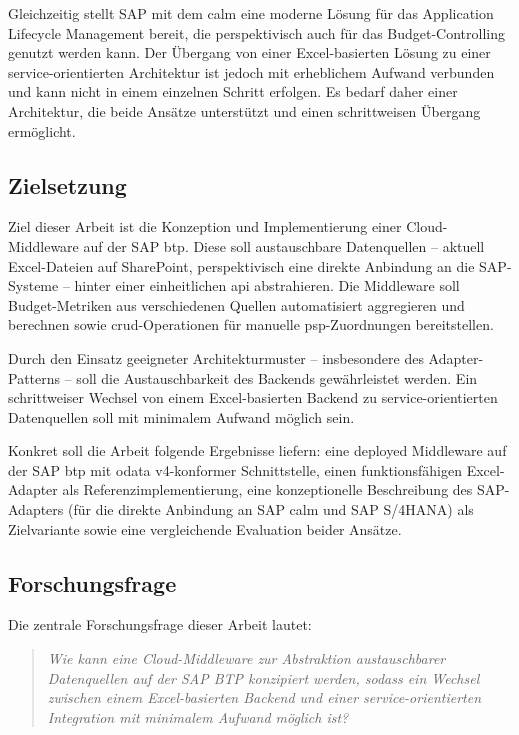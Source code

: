 Gleichzeitig stellt SAP mit dem \gls{calm} eine moderne Lösung für das Application Lifecycle Management bereit, die perspektivisch auch für das Budget-Controlling genutzt werden kann. Der Übergang von einer Excel-basierten Lösung zu einer service-orientierten Architektur ist jedoch mit erheblichem Aufwand verbunden und kann nicht in einem einzelnen Schritt erfolgen. Es bedarf daher einer Architektur, die beide Ansätze unterstützt und einen schrittweisen Übergang ermöglicht.

\subsection{Zielsetzung}

Ziel dieser Arbeit ist die Konzeption und Implementierung einer Cloud-Middleware auf der SAP \gls{btp}. Diese soll austauschbare Datenquellen -- aktuell Excel-Dateien auf SharePoint, perspektivisch eine direkte Anbindung an die SAP-Systeme -- hinter einer einheitlichen \gls{api} abstrahieren. Die Middleware soll Budget-Metriken aus verschiedenen Quellen automatisiert aggregieren und berechnen sowie \gls{crud}-Operationen für manuelle \gls{psp}-Zuordnungen bereitstellen.

Durch den Einsatz geeigneter Architekturmuster -- insbesondere des Adapter-Patterns -- soll die Austauschbarkeit des Backends gewährleistet werden. Ein schrittweiser Wechsel von einem Excel-basierten Backend zu service-orientierten Datenquellen soll mit minimalem Aufwand möglich sein.

Konkret soll die Arbeit folgende Ergebnisse liefern: eine deployed Middleware auf der SAP \gls{btp} mit \gls{odata} v4-konformer Schnittstelle, einen funktionsfähigen Excel-Adapter als Referenzimplementierung, eine konzeptionelle Beschreibung des SAP-Adapters (für die direkte Anbindung an SAP \gls{calm} und SAP S/4HANA) als Zielvariante sowie eine vergleichende Evaluation beider Ansätze.

\subsection{Forschungsfrage}

Die zentrale Forschungsfrage dieser Arbeit lautet:

\begin{quote}
\textit{Wie kann eine Cloud-Middleware zur Abstraktion austauschbarer Datenquellen auf der SAP BTP konzipiert werden, sodass ein Wechsel zwischen einem Excel-basierten Backend und einer service-orientierten Integration mit minimalem Aufwand möglich ist?}
\end{quote}


